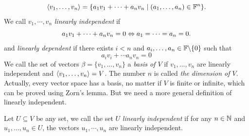 \[
  \left\langle v_1,\dots,v_n \right\rangle = \{a_1v_1 + \dots + a_nv_n \mid (a_1,\dots, a_n) \in \mathbb{F}^n\}.
\]
We call $v_1,\cdots, v_n$ \textit{linearly independent} if 
\[
  a_1v_1 + \dots + a_n v_n = 0 \Leftrightarrow a_1 = \cdots = a_n = 0.
\]
and \textit{linearly dependent} if there exists $i < n$ and $a_i,\dots, a_n \in \mathbb{F} \backslash \{0\}$ such that 
\[
  a_iv_i + \cdots a_n v_n = 0
\]
We call the set of vectors $\beta = \{v_1,\dots, v_n\}$ a \textit{basis of $V$} if $v_1,\dots, v_n$ are linearly independent and $\left\langle v_1,\dots, v_n \right\rangle = V$. The number $n$ is called \textit{the dimension of $V$}. Actually, every vector space has a basis, no matter if $V$ is finite or infinite, which can be proved using Zorn's lemma. But we need a more general definition of linearly independent. 

Let $U \subseteq V$ be any set, we call the set $U$ \textit{linearly independent} if for any $n \in \mathbb{N}$ and $u_1,\dots, u_n \in U$, the vectors $u_1,\cdots, u_n$ are linearly independent.

